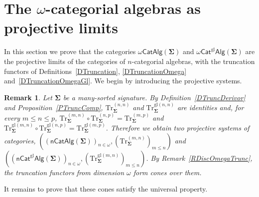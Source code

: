 \documentclass[a4paper, reqno
]{amsart}
\newcommand{\sig}[1]{\mathbf{#1}}             %
\newcommand{\gl}{\mathrm{gl}}                %
\newcommand{\Tr}{\mathrm{Tr}}
\theoremstyle{plain}
\newtheorem{remark}[theorem]{Remark}
\theoremstyle{definition}
\begin{document}
\section{The $\omega$-categorial algebras as projective limits}\label{SLimitSingleSet}\label{SLimitGlobular}

In this section we prove that the categories $\omega\mathsf{CatAlg}(\sig{\Sigma})$ and $\omega\mathsf{Cat}^{\gl}\mathsf{Alg}(\sig{\Sigma})$ are the projective limits of the categories of $n$-categorial algebras, with the truncation functors of Definitions~\ref{DTruncation}, \ref{DTruncationOmega} and~\ref{DTruncationOmegaGl}.
We begin by introducing the projective systems.

\begin{remark}\label{RTruncProjSys}
Let $\sig{\Sigma}$ be a many-sorted signature.
By Definition~\ref{DTruncDerivor} and Proposition~\ref{PTruncComp}, $\Tr^{(n,n)}_{\sig{\Sigma}}$ and $\Tr^{\gl(n,n)}_{\sig{\Sigma}}$ are identities and, for every $m\leq n\leq p$, $\Tr^{(m,n)}_{\sig{\Sigma}}\circ \Tr^{(n,p)}_{\sig{\Sigma}}=\Tr^{(m,p)}_{\sig{\Sigma}}$ and $\Tr^{\gl(m,n)}_{\sig{\Sigma}}\circ \Tr^{\gl(n,p)}_{\sig{\Sigma}}=\Tr^{\gl(m,p)}_{\sig{\Sigma}}$.
Therefore we obtain two projective systems of categories, $((\mathsf{nCatAlg}(\sig{\Sigma}))_{n\in\omega},(\Tr^{(m,n)}_{\sig{\Sigma}})_{m\leq n})$ and $((\mathsf{nCat}^{\gl}\mathsf{Alg}(\sig{\Sigma}))_{n\in\omega},(\Tr^{\gl(m,n)}_{\sig{\Sigma}})_{m\leq n})$.
By Remark~\ref{RDiscOmegaTrunc}, the truncation functors from dimension $\omega$ form cones over them.
\end{remark}

It remains to prove that these cones satisfy the universal property.
\end{document}
